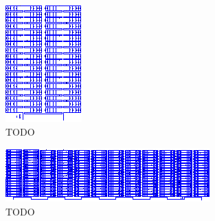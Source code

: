 \begin{figure}[h!tb]
    \centering
    \includegraphics[width=\textwidth]{images/ltspice/generic-iv-curves/module.eps}
    \caption{%
        TODO
    }
    \label{fig:ltspice:iv:generic:module}
\end{figure}

{\begin{a3pages}
    \begin{figure}[h!tb]
        \centering
        \includegraphics[width=\textwidth]{images/ltspice/generic-iv-curves/array.eps}
        \caption{%
            TODO
        }
        \label{fig:ltspice:iv:generic:array}
    \end{figure}
\end{a3pages}}
